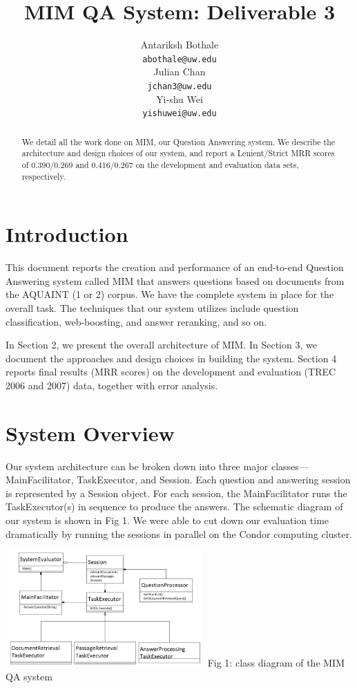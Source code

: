 \documentclass[11pt]{article}
\title{MIM QA System: Deliverable 3}
\author{Antariksh Bothale \\
  {\tt abothale@uw.edu} \\\And
  Julian Chan\\
  {\tt jchan3@uw.edu} \\\And
  Yi-shu Wei\\
  {\tt yishuwei@uw.edu}}
\date{}
\begin{document}
\maketitle
\begin{abstract}
We detail all the work done on MIM, our Question Answering system. We describe the architecture and design choices of our system, and report a Lenient/Strict MRR scores of 0.390/0.269 and 0.416/0.267 on the development and evaluation data sets, respectively.
\end{abstract}

\section{Introduction}
This document reports the creation and performance of an end-to-end Question Answering system called MIM that answers questions based on documents from the AQUAINT (1 or 2) corpus. We have the complete system in place for the overall task. The techniques that our system utilizes include question classification, web-boosting, and answer reranking, and so on.

In Section 2, we present the overall architecture of MIM. In Section 3, we document the approaches and design choices in building the system. Section 4 reports final results (MRR scores) on the development and evaluation (TREC 2006 and 2007) data, together with error analysis.

\section{System Overview}

Our system architecture can be broken down into three major classes---MainFacilitator, TaskExecutor, and Session. Each question and answering session is represented by a Session object. For each session, the MainFacilitator runs the TaskExecutor(s) in sequence to produce the answers. The schematic diagram of our system is shown in Fig 1. We were able to cut down our evaluation time dramatically by running the sessions in parallel on the Condor computing cluster. 

\includegraphics[width=3in,height=1.75in]{MIM_class_diagram.png}
Fig 1: class diagram of the MIM QA system
\end{document}
